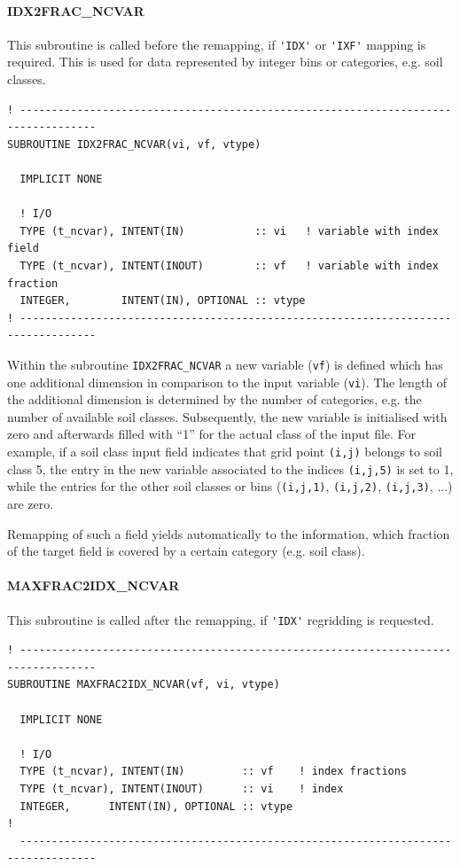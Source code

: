 \documentclass[11pt,twoside]{article}
\begin{document}
\paragraph{\label{IDX2FRAC}IDX2FRAC\_NCVAR\\}
This subroutine is called before the remapping,  if \verb|'IDX'| or 
\verb|'IXF'| mapping is required. This is used for data represented
by integer bins or categories, e.g. soil classes.

\begin{verbatim}
! ----------------------------------------------------------------------------------
SUBROUTINE IDX2FRAC_NCVAR(vi, vf, vtype)

  IMPLICIT NONE

  ! I/O
  TYPE (t_ncvar), INTENT(IN)           :: vi   ! variable with index field
  TYPE (t_ncvar), INTENT(INOUT)        :: vf   ! variable with index fraction
  INTEGER,        INTENT(IN), OPTIONAL :: vtype
! ----------------------------------------------------------------------------------
\end{verbatim}
Within the subroutine \verb|IDX2FRAC_NCVAR| a new  variable (\verb|vf|) 
is defined which has 
 one additional dimension in comparison to the input variable (\verb|vi|).
The length of the additional dimension is determined by the number of 
categories, e.g. the number of available soil classes.
Subsequently, the new variable is initialised with zero and afterwards filled
with ``1'' for the actual class of the input file.
For example, if a soil class input field indicates that grid point \verb|(i,j)|
belongs to soil class 5, the entry in the new variable associated to
the indices \verb|(i,j,5)| is set to 1, while the entries for the other
soil classes or bins (\verb|(i,j,1)|, \verb|(i,j,2)|, \verb|(i,j,3)|,
...) are zero. 

Remapping of such a field yields automatically to the information, which
fraction of the target field is covered by a certain category (e.g. soil class).

\paragraph{MAXFRAC2IDX\_NCVAR\\\label{MFRAC2IDX}}
This subroutine is called after the remapping, if \verb|'IDX'| regridding
is requested.
\begin{verbatim}
! ----------------------------------------------------------------------------------
SUBROUTINE MAXFRAC2IDX_NCVAR(vf, vi, vtype)

  IMPLICIT NONE

  ! I/O
  TYPE (t_ncvar), INTENT(IN)         :: vf    ! index fractions
  TYPE (t_ncvar), INTENT(INOUT)      :: vi    ! index
  INTEGER,      INTENT(IN), OPTIONAL :: vtype
!
  ----------------------------------------------------------------------------------
\end{verbatim}
\end{document}

